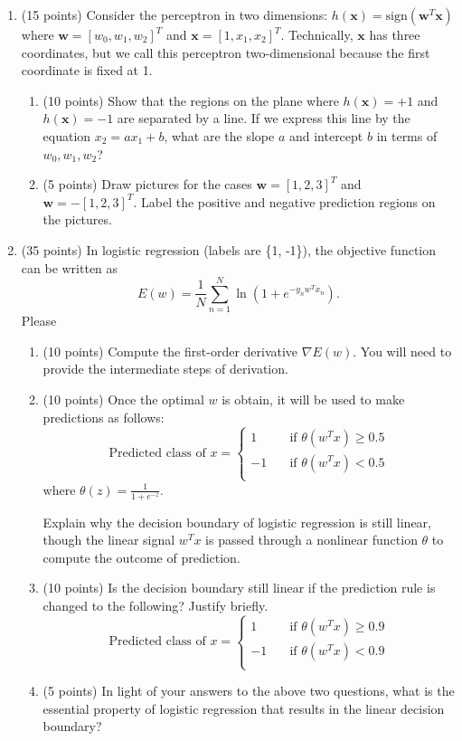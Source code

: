 \documentclass[11pt]{article}
\begin{document}
\begin{enumerate}
\item (15 points) Consider the perceptron in two dimensions:
$h(\boldsymbol x) = \mbox{sign}(\boldsymbol w^T \boldsymbol x)$
where $\boldsymbol w = [w_0, w_1, w_2]^T$ and $\boldsymbol x =
[1, x_1, x_2]^T$. Technically, $\boldsymbol x$ has three
coordinates, but we call this perceptron two-dimensional because
the first coordinate is fixed at 1.

\begin{enumerate}
    \item (10 points) Show that the regions on the plane where $h(\boldsymbol
    x) = +1$ and $h(\boldsymbol x) = -1$ are separated by a line.
    If we express this line by the equation $x_2 = ax_1 + b$,
    what are the slope $a$ and intercept $b$ in terms of $w_0, w_1,
    w_2$?
    \item (5 points) Draw pictures for the cases $\boldsymbol w=[1,2,3]^T$
    and $\boldsymbol w=-[1,2,3]^T$. Label the positive and negative
    prediction regions on the pictures.
\end{enumerate}

\item (35 points) In logistic regression (labels are \{1, -1\}),
the objective function  can be written as
$$E(w)=\frac{1}{N}\sum_{n=1}^N\ln\left(1+e^{-y_n
w^Tx_n}\right).$$ Please
\begin{enumerate}
\item (10 points) Compute the first-order derivative $\nabla E(w)$. You will
need to provide the intermediate steps of derivation.
\item (10 points) Once the optimal $w$ is obtain, it will be used to make
predictions as follows:
\[ \mbox{Predicted class of }x =
  \begin{cases}
    1       & \quad \text{if } \theta(w^Tx)\geq 0.5\\
    -1  & \quad \text{if } \theta(w^Tx)<0.5\\
  \end{cases}
\]
where $\theta(z)=\frac{1}{1+e^{-z}}$.

Explain why the decision boundary of logistic regression is still
linear, though the linear signal $w^Tx$ is passed through a
nonlinear function $\theta$ to compute the outcome of prediction.
\item (10 points) Is the decision boundary still linear if the prediction rule
is changed to the following? Justify briefly.
\[ \mbox{Predicted class of }x =
  \begin{cases}
    1       & \quad \text{if } \theta(w^Tx)\geq 0.9\\
    -1  & \quad \text{if } \theta(w^Tx)<0.9\\
  \end{cases}
\]
\item (5 points) In light of your answers to the above two questions, what is
the essential property of logistic regression that results in the
linear decision boundary?


\end{enumerate}
\end{enumerate}
\end{document}
